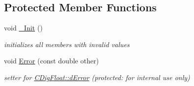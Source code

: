 \subsection*{Protected Member Functions}
\begin{DoxyCompactItemize}
\item 
void \hyperlink{classCDigFloat_a89a0dda21c74c115ac41b432031666a6}{\+\_\+\+Init} ()
\begin{DoxyCompactList}\small\item\em initializes all members with invalid values \end{DoxyCompactList}\item 
void \hyperlink{classCDigFloat_a5fdd0d560073f5d06b41c7f66933635e}{Error} (const double other)
\begin{DoxyCompactList}\small\item\em setter for \hyperlink{classCDigFloat_a25eb3782d1e727ff007a48f8308e3d4d}{C\+Dig\+Float\+::d\+Error} (protected\+: for internal use only) \end{DoxyCompactList}\end{DoxyCompactItemize}
